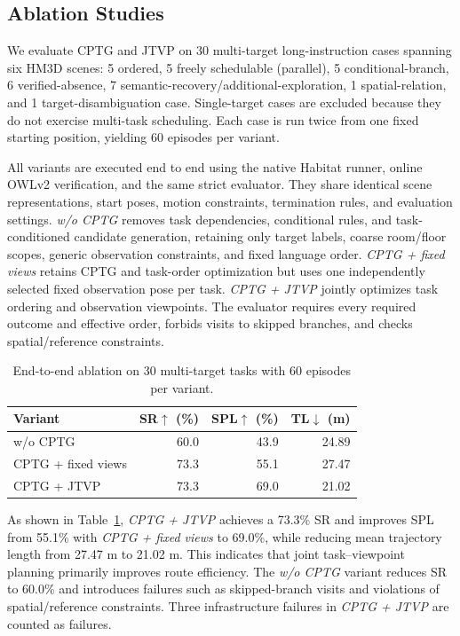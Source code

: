\documentclass[letterpaper,10pt,conference]{ieeeconf}
\begin{document}
\subsection{Ablation Studies}
We evaluate CPTG and JTVP on 30 multi-target long-instruction cases spanning six HM3D scenes: 5 ordered, 5 freely schedulable (parallel), 5 conditional-branch, 6 verified-absence, 7 semantic-recovery/additional-exploration, 1 spatial-relation, and 1 target-disambiguation case. Single-target cases are excluded because they do not exercise multi-task scheduling. Each case is run twice from one fixed starting position, yielding 60 episodes per variant.

All variants are executed end to end using the native Habitat runner, online OWLv2 verification, and the same strict evaluator. They share identical scene representations, start poses, motion constraints, termination rules, and evaluation settings. \emph{w/o CPTG} removes task dependencies, conditional rules, and task-conditioned candidate generation, retaining only target labels, coarse room/floor scopes, generic observation constraints, and fixed language order. \emph{CPTG + fixed views} retains CPTG and task-order optimization but uses one independently selected fixed observation pose per task. \emph{CPTG + JTVP} jointly optimizes task ordering and observation viewpoints. The evaluator requires every required outcome and effective order, forbids visits to skipped branches, and checks spatial/reference constraints.

\begin{table}[t]
\caption{End-to-end ablation on 30 multi-target tasks with 60 episodes per variant.}
\label{tab:ablation}\centering\scriptsize\setlength{\tabcolsep}{2pt}
\begin{tabular}{lrrr}\toprule
Variant&SR$\uparrow$ (\%)&SPL$\uparrow$ (\%)&TL$\downarrow$ (m)\\\midrule
w/o CPTG&60.0&43.9&24.89\\
CPTG + fixed views&73.3&55.1&27.47\\
CPTG + JTVP&73.3&69.0&21.02\\\bottomrule
\end{tabular}
\end{table}

As shown in Table~\ref{tab:ablation}, \emph{CPTG + JTVP} achieves a 73.3\% SR and improves SPL from 55.1\% with \emph{CPTG + fixed views} to 69.0\%, while reducing mean trajectory length from 27.47 m to 21.02 m. This indicates that joint task--viewpoint planning primarily improves route efficiency. The \emph{w/o CPTG} variant reduces SR to 60.0\% and introduces failures such as skipped-branch visits and violations of spatial/reference constraints. Three infrastructure failures in \emph{CPTG + JTVP} are counted as failures.
\end{document}
